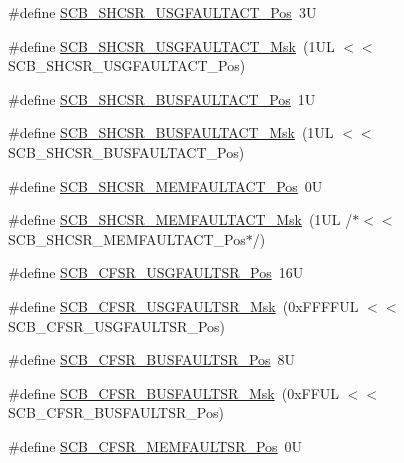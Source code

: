 \begin{DoxyCompactItemize}
\#define \hyperlink{group___c_m_s_i_s___s_c_b_gae06f54f5081f01ed3f6824e451ad3656}{S\+C\+B\+\_\+\+S\+H\+C\+S\+R\+\_\+\+U\+S\+G\+F\+A\+U\+L\+T\+A\+C\+T\+\_\+\+Pos}~3U
\item 
\#define \hyperlink{group___c_m_s_i_s___s_c_b_gab3166103b5a5f7931d0df90949c47dfe}{S\+C\+B\+\_\+\+S\+H\+C\+S\+R\+\_\+\+U\+S\+G\+F\+A\+U\+L\+T\+A\+C\+T\+\_\+\+Msk}~(1\+U\+L $<$$<$ S\+C\+B\+\_\+\+S\+H\+C\+S\+R\+\_\+\+U\+S\+G\+F\+A\+U\+L\+T\+A\+C\+T\+\_\+\+Pos)
\item 
\#define \hyperlink{group___c_m_s_i_s___s_c_b_gaf272760f2df9ecdd8a5fbbd65c0b767a}{S\+C\+B\+\_\+\+S\+H\+C\+S\+R\+\_\+\+B\+U\+S\+F\+A\+U\+L\+T\+A\+C\+T\+\_\+\+Pos}~1U
\item 
\#define \hyperlink{group___c_m_s_i_s___s_c_b_ga9d7a8b1054b655ad08d85c3c535d4f73}{S\+C\+B\+\_\+\+S\+H\+C\+S\+R\+\_\+\+B\+U\+S\+F\+A\+U\+L\+T\+A\+C\+T\+\_\+\+Msk}~(1\+U\+L $<$$<$ S\+C\+B\+\_\+\+S\+H\+C\+S\+R\+\_\+\+B\+U\+S\+F\+A\+U\+L\+T\+A\+C\+T\+\_\+\+Pos)
\item 
\#define \hyperlink{group___c_m_s_i_s___s_c_b_ga7c856f79a75dcc1d1517b19a67691803}{S\+C\+B\+\_\+\+S\+H\+C\+S\+R\+\_\+\+M\+E\+M\+F\+A\+U\+L\+T\+A\+C\+T\+\_\+\+Pos}~0U
\item 
\#define \hyperlink{group___c_m_s_i_s___s_c_b_ga9147fd4e1b12394ae26eadf900a023a3}{S\+C\+B\+\_\+\+S\+H\+C\+S\+R\+\_\+\+M\+E\+M\+F\+A\+U\+L\+T\+A\+C\+T\+\_\+\+Msk}~(1\+U\+L /$\ast$$<$$<$ S\+C\+B\+\_\+\+S\+H\+C\+S\+R\+\_\+\+M\+E\+M\+F\+A\+U\+L\+T\+A\+C\+T\+\_\+\+Pos$\ast$/)
\item 
\#define \hyperlink{group___c_m_s_i_s___s_c_b_gac8e4197b295c8560e68e2d71285c7879}{S\+C\+B\+\_\+\+C\+F\+S\+R\+\_\+\+U\+S\+G\+F\+A\+U\+L\+T\+S\+R\+\_\+\+Pos}~16U
\item 
\#define \hyperlink{group___c_m_s_i_s___s_c_b_ga565807b1a3f31891f1f967d0fa30d03f}{S\+C\+B\+\_\+\+C\+F\+S\+R\+\_\+\+U\+S\+G\+F\+A\+U\+L\+T\+S\+R\+\_\+\+Msk}~(0x\+F\+F\+F\+F\+U\+L $<$$<$ S\+C\+B\+\_\+\+C\+F\+S\+R\+\_\+\+U\+S\+G\+F\+A\+U\+L\+T\+S\+R\+\_\+\+Pos)
\item 
\#define \hyperlink{group___c_m_s_i_s___s_c_b_ga555a24f4f57d199f91d1d1ab7c8c3c8a}{S\+C\+B\+\_\+\+C\+F\+S\+R\+\_\+\+B\+U\+S\+F\+A\+U\+L\+T\+S\+R\+\_\+\+Pos}~8U
\item 
\#define \hyperlink{group___c_m_s_i_s___s_c_b_ga26dc1ddfdc37a6b92597a6f7e498c1d6}{S\+C\+B\+\_\+\+C\+F\+S\+R\+\_\+\+B\+U\+S\+F\+A\+U\+L\+T\+S\+R\+\_\+\+Msk}~(0x\+F\+F\+U\+L $<$$<$ S\+C\+B\+\_\+\+C\+F\+S\+R\+\_\+\+B\+U\+S\+F\+A\+U\+L\+T\+S\+R\+\_\+\+Pos)
\item 
\#define \hyperlink{group___c_m_s_i_s___s_c_b_ga91f41491cec5b5acca3fbc94efbd799e}{S\+C\+B\+\_\+\+C\+F\+S\+R\+\_\+\+M\+E\+M\+F\+A\+U\+L\+T\+S\+R\+\_\+\+Pos}~0U

\end{DoxyCompactItemize}
